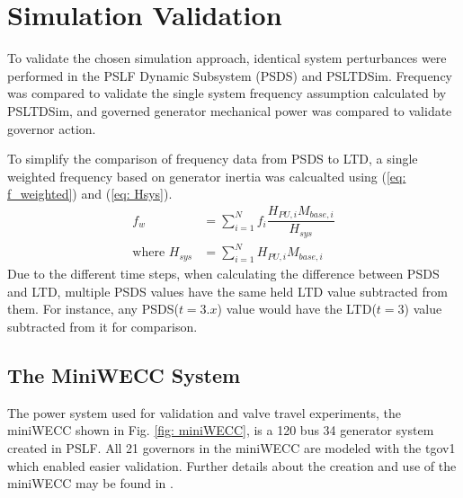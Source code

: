\section{Simulation Validation}
To validate the chosen simulation approach, identical system perturbances were performed in the PSLF Dynamic Subsystem (PSDS) and PSLTDSim.
Frequency was compared to validate the single system frequency assumption calculated by PSLTDSim, and governed generator mechanical power was compared to validate governor action.

To simplify the comparison of frequency data from PSDS to LTD, a single weighted frequency based on generator inertia was calcualted using (\ref{eq: f_weighted}) and (\ref{eq: Hsys}).
\begin{align}
f_{w} &= \sum_{i=1}^{N} f_i \dfrac{H_{PU, i} M_{base, i} }{H_{sys}}  \label{eq: f_weighted}\\
\text{where } H_{sys} &= \sum_{i=1}^{N} H_{PU, i} M_{base, i}  \label{eq: Hsys}
\end{align}%
Due to the different time steps, when calculating the difference between PSDS and LTD, multiple PSDS values have the same held LTD value subtracted from them. 
For instance, any PSDS($t = 3.x$) value would have the LTD($t = 3$) value subtracted from it for comparison.


\subsection{The MiniWECC System}

The power system used for validation and valve travel experiments, the miniWECC shown in Fig. \ref{fig: miniWECC}, is a 120 bus 34 generator system created in PSLF.
All 21 governors in the miniWECC are modeled with the tgov1 which enabled easier validation.
Further details about the creation and use of the miniWECC may be found in \cite{trudnowski2012, sandia2015, RJminiWECC}.

